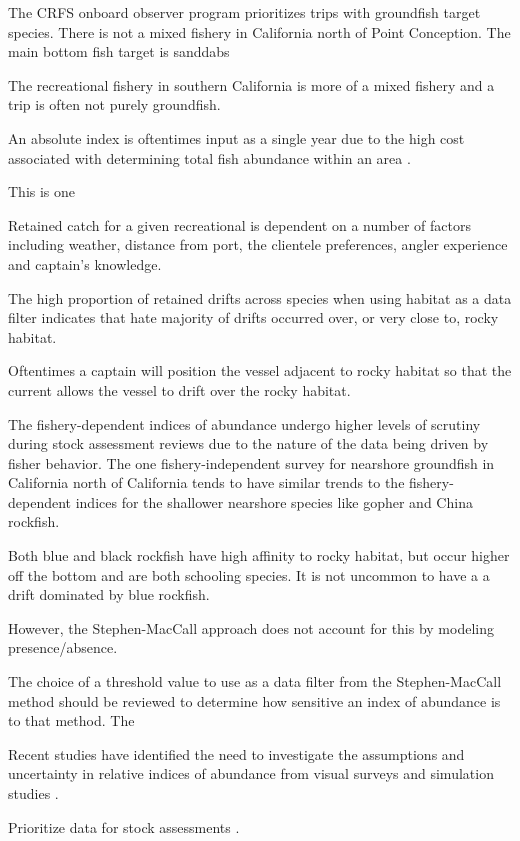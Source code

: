 \documentclass[
  authoryear,
  preprint,
  3p]{elsarticle}
\begin{document}
The CRFS onboard observer program prioritizes trips with groundfish
target species. There is not a mixed fishery in California north of
Point Conception. The main bottom fish target is sanddabs

The recreational fishery in southern California is more of a mixed
fishery and a trip is often not purely groundfish.

An absolute index is oftentimes input as a single year due to the high
cost associated with determining total fish abundance within an area
\citep{Love:2009:DFA}.

This is one

Retained catch for a given recreational is dependent on a number of
factors including weather, distance from port, the clientele
preferences, angler experience and captain's knowledge.

The high proportion of retained drifts across species when using habitat
as a data filter indicates that hate majority of drifts occurred over,
or very close to, rocky habitat.

Oftentimes a captain will position the vessel adjacent to rocky habitat
so that the current allows the vessel to drift over the rocky habitat.

The fishery-dependent indices of abundance undergo higher levels of
scrutiny during stock assessment reviews due to the nature of the data
being driven by fisher behavior. The one fishery-independent survey for
nearshore groundfish in California north of California tends to have
similar trends to the fishery-dependent indices for the shallower
nearshore species like gopher and China rockfish.

Both blue and black rockfish have high affinity to rocky habitat, but
occur higher off the bottom and are both schooling species. It is not
uncommon to have a a drift dominated by blue rockfish.

However, the Stephen-MacCall approach does not account for this by
modeling presence/absence.

The choice of a threshold value to use as a data filter from the
Stephen-MacCall method should be reviewed to determine how sensitive an
index of abundance is to that method. The

Recent studies have identified the need to investigate the assumptions
and uncertainty in relative indices of abundance from visual surveys
\citep{Bacheler:2015:ERA, Campbell:2015:CRA} and simulation studies
\citep{Siegfried:2016:ISA}.

Prioritize data for stock assessments \citep{Magnusson:2007:WMF}.
\end{document}
